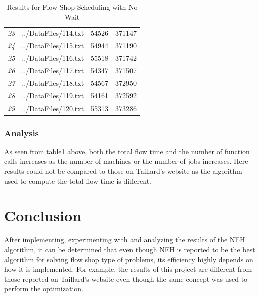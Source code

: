 \documentclass[12pt]{article}
\begin{document}
\begin{table}[ht]
{\begin{tabular}{rlrr}
								{\textit{23}} & ../DataFiles/114.txt & 54526 & 371147 \\ 
								{\textit{24}} & ../DataFiles/115.txt & 54944 & 371190 \\ 
								{\textit{25}} & ../DataFiles/116.txt & 55518 & 371742 \\ 
								{\textit{26}} & ../DataFiles/117.txt & 54347 & 371507 \\ 
								{\textit{27}} & ../DataFiles/118.txt & 54567 & 372950 \\ 
								{\textit{28}} & ../DataFiles/119.txt & 54161 & 372592 \\ 
								{\textit{29}} & ../DataFiles/120.txt & 55313 & 373286 \\ 
								\hline
							\end{tabular}
							
						}
						\caption{Results for Flow Shop Scheduling with No Wait}
					\end{table}
		
				\subsubsection{Analysis}
				As seen from table1 above, both the total flow time and the number of function calls increases as the number of machines or the number of jobs increases. Here results could not be compared to those on Taillard's website as the algorithm used to compute the total flow time is different. 
				
					
					
	\section{Conclusion}
			After implementing, experimenting with and analyzing the results of the NEH algorithm, it can be determined that even though NEH is reported to be the best algorithm for solving flow shop type of problems, its efficiency highly depends on how it is implemented. For example, the results of this project are different from those reported on Taillard's website even though the same concept was used to perform the optimization.
			
\end{document}
